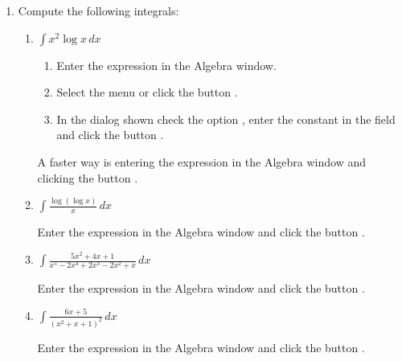 \begin{enumerate}[leftmargin=*]
\item Compute the following integrals:
\begin{enumerate}
\item $ \int{x^2 \log x\,dx}$
\begin{indication}
\begin{enumerate}
\item Enter the expression  in the Algebra window.
\item Select the menu  or click the button .
\item In the dialog shown check the option , enter the constant  in the field  and click the button .
\end{enumerate}
A faster way is entering the expression  in the Algebra window and clicking the button .
\end{indication}

\item $\displaystyle \int \frac{\log(\log x)}{x}\,dx$
\begin{indication}
Enter the expression  in the Algebra window and click the button .
\end{indication}

\item $\displaystyle \int \frac{5x^{2}+4x+1}{x^{5}-2x^{4}+2x^{3}-2x^{2}+x}\,dx$
\begin{indication}
Enter the expression  in the Algebra window and click the button .
\end{indication}

\item $\displaystyle \int \frac{6x+5}{(x^{2}+x+1)^{2}}\,dx$
\begin{indication}
Enter the expression  in the Algebra window and click the button .
\end{indication}
\end{enumerate}



\end{enumerate}
